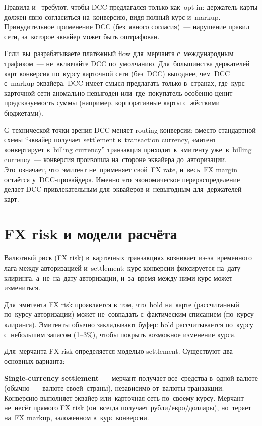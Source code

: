 Правила  и~ требуют,
чтобы DCC предлагался только как~opt-in: держатель карты должен
явно согласиться на~конверсию, видя полный курс и~markup.
Принудительное применение DCC (без~явного согласия)~---
нарушение правил сети, за~которое эквайер может быть
оштрафован.

\begin{practice}
  Если~вы~разрабатываете платёжный flow для~мерчанта
  с~международным трафиком~--- не~включайте DCC по~умолчанию.
  Для~большинства держателей карт конверсия по~курсу карточной
  сети (без~DCC) выгоднее, чем~DCC с~markup эквайера.
  DCC имеет смысл предлагать только в~странах, где~курс
  карточной сети аномально невыгоден или~где~покупатель
  особенно ценит предсказуемость суммы (например,
  корпоративные карты с~жёсткими бюджетами).
\end{practice}

С~технической точки зрения DCC меняет routing конверсии:
вместо стандартной схемы \enquote{эквайер получает settlement
  в~transaction currency, эмитент конвертирует в~billing currency}
транзакция приходит к~эмитенту уже~в~billing currency~---
конверсия произошла на~стороне эквайера до~авторизации.
Это~означает, что~эмитент не~применяет свой~FX rate,
и~весь~FX margin остаётся у~DCC-провайдера. Именно
это~экономическое перераспределение делает DCC привлекательным
для~эквайеров и~невыгодным для~держателей карт.


\section{FX risk и модели расчёта}
\label{sec:mc-fx-risk}

Валютный риск (FX risk) в~карточных транзакциях возникает
из-за~временного лага между авторизацией и~settlement:
курс конверсии фиксируется на~дату клиринга, а~не~на~дату
авторизации, и~за~время между ними курс может измениться.

Для~эмитента FX risk проявляется в~том, что~hold
на~карте (рассчитанный по~курсу авторизации) может не~совпадать
с~фактическим списанием (по~курсу клиринга). Эмитенты
обычно закладывают буфер: hold рассчитывается по~курсу
с~небольшим запасом (1--3\%), чтобы покрыть возможное
изменение курса.

Для~мерчанта FX risk определяется моделью settlement.
Существуют два основных варианта:

\textbf{Single-currency settlement}~--- мерчант получает
все~средства в~одной валюте (обычно~--- валюте своей~страны),
независимо от~валюты транзакции. Конверсию выполняет
эквайер или~карточная сеть по~своему курсу. Мерчант не~несёт
прямого FX risk (он~всегда получает рубли/евро/доллары),
но~теряет на~FX markup, заложенном в~курс конверсии.

